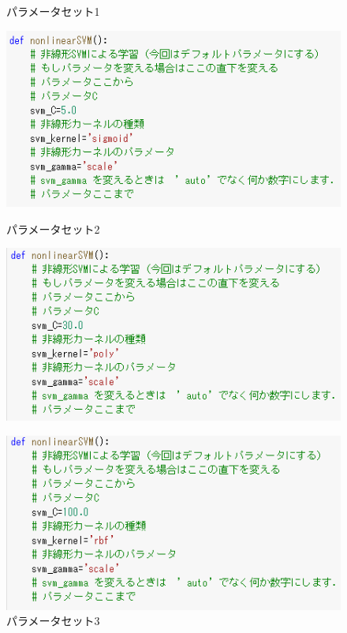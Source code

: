 \begin{figure}[htbp]
  \begin{minipage}[t]{0.33\hsize}
    \centering
    \caption{パラメータセット1}
    \label{graph:5}
    \includegraphics[keepaspectratio, scale=0.5]{3-1-1r.PNG}
  \end{minipage}
  \begin{minipage}[t]{0.33\hsize}
    \centering
    \caption{パラメータセット2}
    \label{graph:6}
    \includegraphics[keepaspectratio, scale=0.5]{3-1-2r.PNG}
  \end{minipage}
  \begin{minipage}[t]{0.33\hsize}
    \centering
    \caption{パラメータセット3}
    \label{graph:7}
    \includegraphics[keepaspectratio, scale=0.5]{3-1-3r.PNG}

\end{minipage}
\end{figure}
